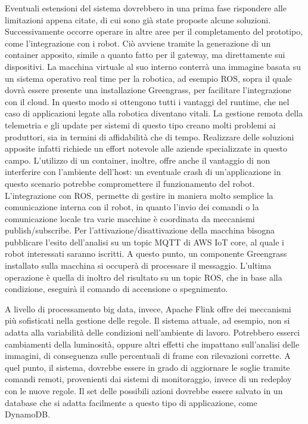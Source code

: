 Eventuali estensioni del sistema dovrebbero in una prima fase rispondere alle limitazioni appena citate, di cui sono già state proposte alcune soluzioni. Successivamente occorre operare in altre aree per il completamento del prototipo, come l'integrazione con i robot. Ciò avviene tramite la generazione di un container apposito, simile a quanto fatto per il gateway, ma direttamente sui dispositivi. La macchina virtuale al suo interno conterrà una immagine basata su un sistema operativo real time per la robotica, ad esempio ROS, sopra il quale dovrà essere presente una installazione Greengrass, per facilitare l'integrazione con il cloud. In questo modo si ottengono tutti i vantaggi del runtime, che nel caso di applicazioni legate alla robotica diventano vitali. La gestione remota della telemetria e gli update per sistemi di questo tipo creano molti problemi ai produttori, sia in termini di affidabilità che di tempo. Realizzare delle soluzioni apposite infatti richiede un effort notevole alle aziende specializzate in questo campo. L'utilizzo di un container, inoltre, offre anche il vantaggio di non interferire con l'ambiente dell'host: un eventuale crash di un'applicazione in questo scenario potrebbe compromettere il funzionamento del robot. L'integrazione con ROS, permette di gestire in maniera molto semplice la comunicazione interna con il robot, in quanto l'invio dei comandi o la comunicazione locale tra varie macchine è coordinata da meccanismi publish/subscribe. Per l'attivazione/disattivazione della macchina bisogna pubblicare l'esito dell'analisi su un topic MQTT di AWS IoT core, al quale i robot interessati saranno iscritti. A questo punto, un componente Greengrass installato sulla macchina si occuperà di processare il messaggio. L'ultima operazione è quella di inoltro del risultato su un topic ROS, che in base alla condizione, eseguirà il comando di accensione o spegnimento.

A livello di processamento big data, invece, Apache Flink offre dei meccanismi più sofisticati nella gestione delle regole. Il sistema attuale, ad esempio, non si adatta alla variabilità delle condizioni nell'ambiente di lavoro. Potrebbero esserci cambiamenti della luminosità, oppure altri effetti che impattano sull'analisi delle immagini, di conseguenza sulle percentuali di frame con rilevazioni corrette. A quel punto, il sistema, dovrebbe essere in grado di aggiornare le soglie tramite comandi remoti, provenienti dai sistemi di monitoraggio, invece di un redeploy con le nuove regole. Il set delle possibili azioni dovrebbe essere salvato in un database che si adatta facilmente a questo tipo di applicazione, come DynamoDB. 

